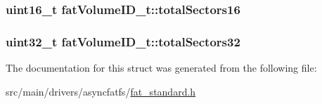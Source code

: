 \hypertarget{structfatVolumeID__t_a66b43acef1c26f30baea7534e99964c2}{
\subsubsection[{total\+Sectors16}]{\setlength{\rightskip}{0pt plus 5cm}uint16\+\_\+t fat\+Volume\+I\+D\+\_\+t\+::total\+Sectors16}}\label{structfatVolumeID__t_a66b43acef1c26f30baea7534e99964c2}
\hypertarget{structfatVolumeID__t_a069f2d42bd57ff2515c200429c9cf29e}{
\subsubsection[{total\+Sectors32}]{\setlength{\rightskip}{0pt plus 5cm}uint32\+\_\+t fat\+Volume\+I\+D\+\_\+t\+::total\+Sectors32}}\label{structfatVolumeID__t_a069f2d42bd57ff2515c200429c9cf29e}


The documentation for this struct was generated from the following file\+:\begin{DoxyCompactItemize}
\item 
src/main/drivers/asyncfatfs/\hyperlink{fat__standard_8h}{fat\+\_\+standard.\+h}\end{DoxyCompactItemize}

